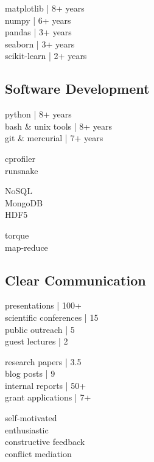 \documentclass[]{winter-resume-openfont}
\begin{document}
\begin{minipage}[t]{0.3\textwidth}
\textbullet{} matplotlib | 8+ years \\ 
\textbullet{} numpy | 6+ years \\ 
\textbullet{} pandas | 3+ years \\ 
\textbullet{} seaborn | 3+ years \\
\textbullet{} scikit-learn | 2+ years \\
\sectionsep
\sectionsep


\subsection{Software Development}
\sectionsep

\textbullet{} python | 8+ years \\
\textbullet{}  bash \& unix tools | 8+ years \\
\textbullet{}  git \& mercurial | 7+ years \\
 \sectionsep

\textbullet{} cprofiler \\ 
\textbullet{} runsnake \\ 
\sectionsep

\textbullet{} NoSQL \\  
\textbullet{} MongoDB \\
\textbullet{} HDF5 \\ 
\sectionsep

\textbullet{} torque \\
\textbullet{} map-reduce \\

\sectionsep
\sectionsep

\subsection{Clear Communication}
\sectionsep

\textbullet{} presentations | 100+  \\
\textbullet{} scientific conferences | 15 \\
\textbullet{} public outreach | 5 \\
\textbullet{} guest lectures | 2\\
\sectionsep

\textbullet{} research papers | 3.5\\
\textbullet{} blog posts | 9\\ 
\textbullet{} internal reports | 50+\\
\textbullet{} grant applications | 7+ \\
\sectionsep

\textbullet{} self-motivated\\
\textbullet{} enthusiastic\\
\textbullet{} constructive feedback\\
\textbullet{} conflict mediation \\

\sectionsep


\end{minipage} 
\end{document}
